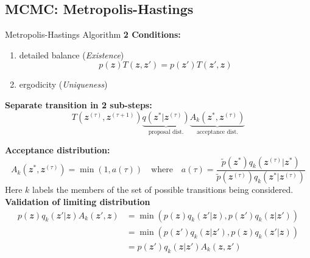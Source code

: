 \documentclass{bredelebeamer}
\begin{document}
\subsection{MCMC: Metropolis-Hastings}
\begin{frame}{Metropolis-Hastings Algorithm}
  \textbf{2 Conditions:}
  \begin{enumerate}
    \item detailed balance (\textit{Existence})
    \begin{equation}
      p(\mathbfit{z}) T(\mathbfit{z},\mathbfit{z}')
      = p(\mathbfit{z}') T(\mathbfit{z}',\mathbfit{z})
    \end{equation}
    \item ergodicity (\textit{Uniqueness})
  \end{enumerate}

  \textbf{Separate transition in 2 sub-steps:}
  \begin{equation}
    T(\mathbfit{z}^{(\tau)},\mathbfit{z}^{(\tau + 1)})
    \underbrace{q(\mathbfit{z}^{*}|\mathbfit{z}^{(\tau)})}_{\textrm{proposal dist.}}
    \underbrace{A_k(\mathbfit{z}^{*}, \mathbfit{z}^{(\tau)})}_{\textrm{acceptance dist.}}
  \end{equation}

  \textbf{Acceptance distribution:}
  \begin{equation}
    A_k(\mathbfit{z}^{*}, \mathbfit{z}^{(\tau)})
    = \min( 1, a(\tau) )
    \quad \textrm{where} \quad
    a(\tau) =
    \frac{\tilde{p}(\mathbfit{z}^{*}) q_k(\mathbfit{z}^{(\tau)}|\mathbfit{z}^{*})}
    {\tilde{p}(\mathbfit{z}^{(\tau)}) q_k(\mathbfit{z}^{*}|\mathbfit{z}^{(\tau)})}
  \end{equation}
  Here $k$ labels the members of the set of possible transitions being
  considered.
  \\[1.0\baselineskip]

  \textbf{Validation of limiting distribution}
  \begin{equation}
    \begin{split}
      p(\mathbfit{z}) q_k(\mathbfit{z}'|\mathbfit{z}) A_k(\mathbfit{z}', \mathbfit{z})
      &= \min(p(\mathbfit{z}) q_k(\mathbfit{z}'|\mathbfit{z}), p(\mathbfit{z}') q_k(\mathbfit{z}|\mathbfit{z}'))  \\
      &= \min(p(\mathbfit{z}') q_k(\mathbfit{z}|\mathbfit{z}'), p(\mathbfit{z}) q_k(\mathbfit{z}'|\mathbfit{z}))  \\
      &= p(\mathbfit{z}') q_k(\mathbfit{z}|\mathbfit{z}') A_k(\mathbfit{z}, \mathbfit{z}')
    \end{split}
  \end{equation}
\end{frame}
\end{document}
